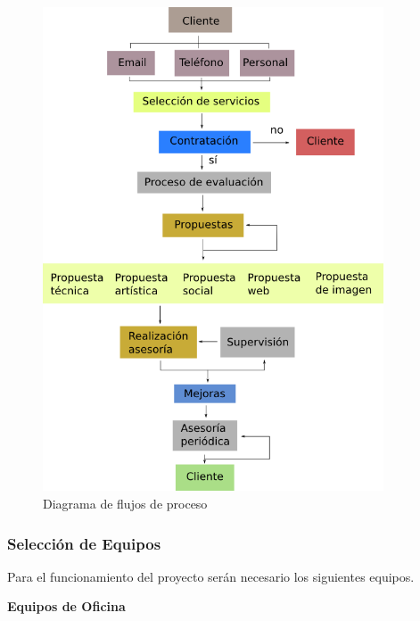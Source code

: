 \begin{figure}[h!t]
   \centering
  \includegraphics[width=0.9\textwidth]{img/flujo_procesos.png}
   \caption{Diagrama de flujos de proceso}
   \label{fig:flujoprocesos}
\end{figure}
\newpage
\subsubsection{Selección de Equipos}
Para el funcionamiento del proyecto serán necesario
los siguientes equipos.

\textbf{Equipos de Oficina}

